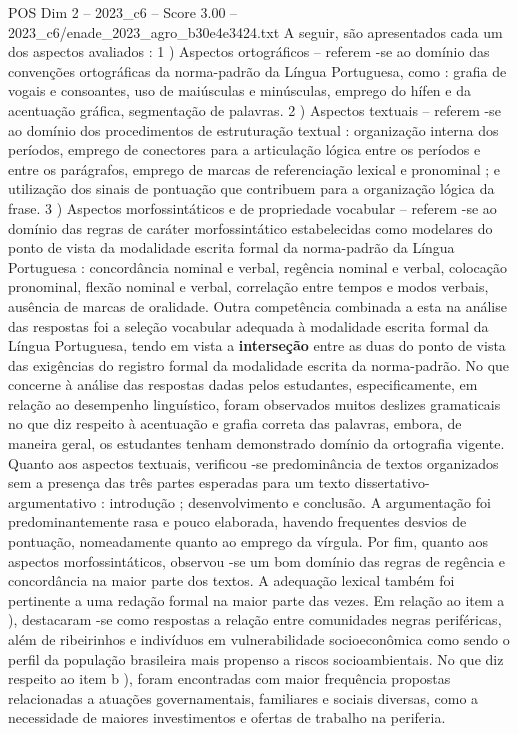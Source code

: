 \begin{textsample}{POS Dim 2 – 2023\_c6 – Score 3.00 – 2023\_c6/enade\_2023\_agro\_b30e4e3424.txt}
A seguir, são apresentados cada um dos aspectos avaliados : 1 ) Aspectos ortográficos – referem -se ao domínio das convenções ortográficas da norma-padrão da Língua Portuguesa, como : grafia de vogais e consoantes, uso de maiúsculas e minúsculas, emprego do hífen e da acentuação gráfica, segmentação de palavras. 2 ) Aspectos textuais – referem -se ao domínio dos procedimentos de estruturação textual : organização interna dos períodos, emprego de conectores para a articulação lógica entre os períodos e entre os parágrafos, emprego de marcas de referenciação lexical e pronominal ; e utilização dos sinais de pontuação que contribuem para a organização lógica da frase. 3 ) Aspectos morfossintáticos e de propriedade vocabular – referem -se ao domínio das regras de caráter morfossintático estabelecidas como modelares do ponto de vista da modalidade escrita formal da norma-padrão da Língua Portuguesa : concordância nominal e verbal, regência nominal e verbal, colocação pronominal, flexão nominal e verbal, correlação entre tempos e modos verbais, ausência de marcas de oralidade.
Outra competência combinada a esta na análise das respostas foi a seleção vocabular adequada à modalidade escrita formal da Língua Portuguesa, tendo em vista a \textbf{interseção} entre as duas do ponto de vista das exigências do registro formal da modalidade escrita da norma-padrão.
No que concerne à análise das respostas dadas pelos estudantes, especificamente, em relação ao desempenho linguístico, foram observados muitos deslizes gramaticais no que diz respeito à acentuação e grafia correta das palavras, embora, de maneira geral, os estudantes tenham demonstrado domínio da ortografia vigente.
Quanto aos aspectos textuais, verificou -se predominância de textos organizados sem a presença das três partes esperadas para um texto dissertativo-argumentativo : introdução ; desenvolvimento e conclusão.
A argumentação foi predominantemente rasa e pouco elaborada, havendo frequentes desvios de pontuação, nomeadamente quanto ao emprego da vírgula.
Por fim, quanto aos aspectos morfossintáticos, observou -se um bom domínio das regras de regência e concordância na maior parte dos textos.
A adequação lexical também foi pertinente a uma redação formal na maior parte das vezes.
Em relação ao item a ), destacaram -se como respostas a relação entre comunidades negras periféricas, além de ribeirinhos e indivíduos em vulnerabilidade socioeconômica como sendo o perfil da população brasileira mais propenso a riscos socioambientais.
No que diz respeito ao item b ), foram encontradas com maior frequência propostas relacionadas a atuações governamentais, familiares e sociais diversas, como a necessidade de maiores investimentos e ofertas de trabalho na periferia.

\end{textsample}
